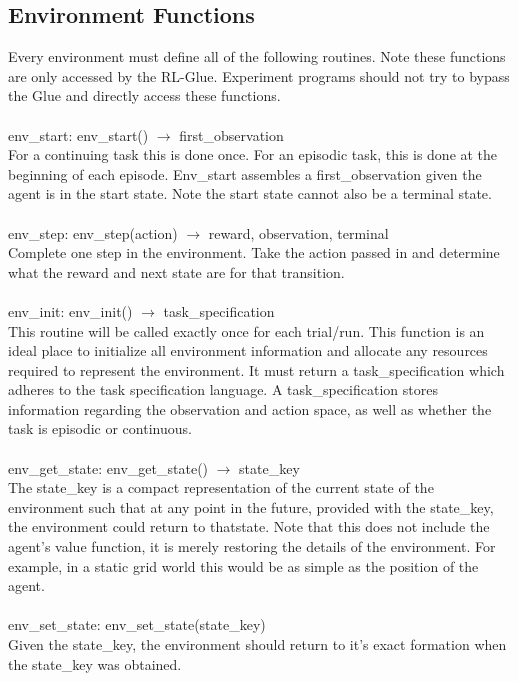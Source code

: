 \documentclass[11pt]{article}
\begin{document}
\subsection{Environment Functions}
\label{Eref}
Every environment must define all of the following routines. Note these functions are only accessed by the RL-Glue. Experiment programs should not try to bypass the Glue and directly access these functions.
\\\\
env\_start: env\_start() $\rightarrow$ first\_observation\\
For a continuing task this is done once. For an episodic task, this is done at the beginning of each episode. Env\_start assembles a first\_observation given the agent is in the start state. Note the start state cannot also be a terminal state.
\\\\
env\_step: env\_step(action) $\rightarrow$ reward, observation, terminal\\
Complete one step in the environment. Take the action passed in and determine what the reward and next state are for that transition.
\\\\
env\_init: env\_init() $\rightarrow$ task\_specification\\
This routine will be called exactly once for each trial/run. This function is an ideal place to initialize all environment information and allocate any resources required to represent the environment. It must return a task\_specification which adheres to the task specification language. A task\_specification stores information regarding the observation and action space, as well as whether the task is episodic or continuous.
\\\\   
env\_get\_state: env\_get\_state() $\rightarrow$ state\_key\\
The state\_key is a compact representation of the current state of the environment such that at any point in the future, provided with the state\_key, the environment could return to thatstate. Note that this does not include the agent's value function, it is merely restoring the details of the environment. For example, in a static grid world this would be as simple as the position of the agent.
\\\\
env\_set\_state: env\_set\_state(state\_key)\\
Given the state\_key, the environment should return to it's exact formation when the state\_key was obtained. 
\end{document}
